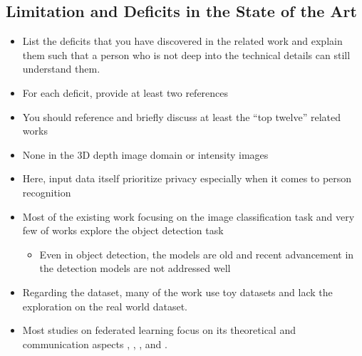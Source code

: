 \documentclass[thesis]{mas_proposal}
\begin{document}
\subsection{Limitation and Deficits in the State of the Art}
\begin{itemize}


      \item List the deficits that you have discovered in the related work and explain them such that a person who is not deep into the technical details can still understand them. 
      \item For each deficit, provide at least two references
      \item You should reference and briefly discuss at least the ``top twelve'' related works
      \item None in the 3D depth image domain or intensity images
      \item Here, input data itself prioritize privacy especially when it comes to person recognition
      \item Most of the existing work focusing on the image classification task and very few of works explore the object detection task
      \begin{itemize}
            \item Even in object detection, the models are old and recent advancement in the detection models are not addressed well
      \end{itemize}
      \item Regarding the dataset, many of the work use toy datasets and lack the exploration on the real world dataset.
      \item Most studies on federated learning focus on its theoretical and communication aspects \cite{acar2021federated}, \cite{lu2022federated}, \cite{li2020federated}, and \cite{pmlr-v119-karimireddy20a}.
      
      
\end{itemize}
\end{document}
